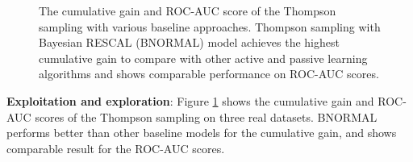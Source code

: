 \begin{figure}[t]
	\centering
	
	\caption{\label{fig:c_gain}The cumulative gain and ROC-AUC score of the Thompson sampling 
	with various baseline approaches. Thompson sampling with Bayesian RESCAL (BNORMAL)
	model achieves the highest cumulative gain to compare with other active and 
	passive learning algorithms and shows comparable performance on ROC-AUC scores.}
\end{figure}


\textbf{Exploitation and exploration}: 
Figure \ref{fig:c_gain} shows 
the cumulative gain and ROC-AUC scores of the Thompson sampling on three real datasets.
BNORMAL performs better than other baseline models for the cumulative gain, and shows comparable result for the ROC-AUC scores.

